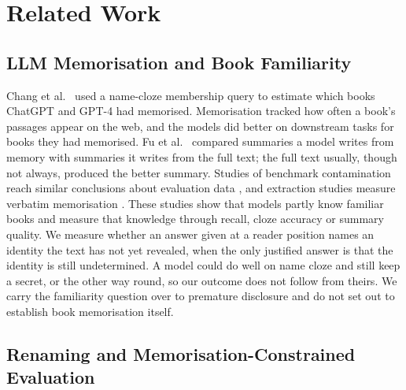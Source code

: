 \documentclass[sn-mathphys]{sn-jnl}%
\theoremstyle{thmstyleone}%
\theoremstyle{thmstyletwo}%
\theoremstyle{thmstylethree}%
\begin{document}
\section{Related Work}\label{sec:related}

\subsection{LLM Memorisation and Book Familiarity}\label{sec:rw-mem}

Chang et al.\ \cite{chang2023speak} used a name-cloze membership query to estimate which books ChatGPT and GPT-4 had memorised. Memorisation tracked how often a book's passages appear on the web, and the models did better on downstream tasks for books they had memorised. Fu et al.\ \cite{fu2026summarization} compared summaries a model writes from memory with summaries it writes from the full text; the full text usually, though not always, produced the better summary. Studies of benchmark contamination reach similar conclusions about evaluation data \cite{sainz2023contamination,golchin2024timetravel}, and extraction studies measure verbatim memorisation \cite{carlini2019secret,carlini2023quantifying}. These studies show that models partly know familiar books and measure that knowledge through recall, cloze accuracy or summary quality. We measure whether an answer given at a reader position names an identity the text has not yet revealed, when the only justified answer is that the identity is still undetermined. A model could do well on name cloze and still keep a secret, or the other way round, so our outcome does not follow from theirs. We carry the familiarity question over to premature disclosure and do not set out to establish book memorisation itself.

\subsection{Renaming and Memorisation-Constrained Evaluation}\label{sec:rw-rename}
\end{document}
